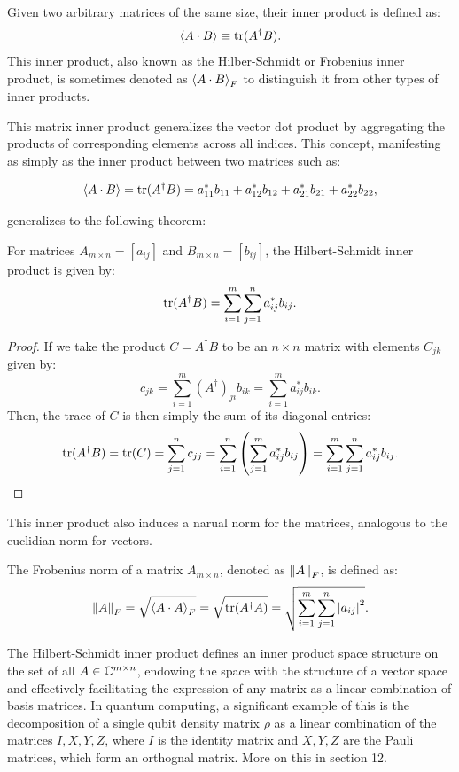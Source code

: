 \documentclass[12pt]{article}
\begin{document}
\begin{definition}
    Given two arbitrary matrices of the same size, their inner product is defined as:
    $$\left\langle A \cdot B \right\rangle \equiv \operatorname{tr}(A^\dagger B).$$
    This inner product, also known as the Hilber-Schmidt or Frobenius inner product, is sometimes denoted as $\left\langle A \cdot B \right\rangle_F$ to distinguish it from other types of inner products. 
\end{definition}

This matrix inner product generalizes the vector dot product by aggregating the products of corresponding elements across all indices. This concept, manifesting as simply as the inner product between two matrices such as:

$$\left\langle A \cdot B \right\rangle
= \operatorname{tr}(A^{\dagger} B)
= a_{11}^{*} b_{11} + a_{12}^{*} b_{12} + a_{21}^{*} b_{21} + a_{22}^{*} b_{22}, $$

generalizes to the following theorem:

\begin{theorem}
    For matrices $A_{m \times n} = [a_{ij}]$ and $B_{m \times n} = [b_{ij}]$, the Hilbert-Schmidt inner product is given by:
    $$\operatorname{tr}(A^\dagger B) = \sum_{i=1}^{m} \sum_{j=1}^{n} a^*_{ij} b_{ij}.$$
\end{theorem}

\begin{proof}
    If we take the product $C = A^\dagger B$ to be an $n \times n$ matrix with elements $C_{jk}$ given by:
    $$c_{jk} = \sum_{i=1}^{m} (A^\dagger)_{ji} b_{ik} = \sum_{i=1}^{m} a^*_{ij} b_{ik}.$$
    Then, the trace of $C$ is then simply the sum of its diagonal entries:
    $$\operatorname{tr}(A^\dagger B) = \operatorname{tr}(C) = \sum_{j=1}^{n} c_{jj} = \sum_{i=1}^{n}\left( \sum_{j=1}^{m} a^*_{ij} b_{ij}\right)  = \sum_{i=1}^{m} \sum_{j=1}^{n} a^*_{ij} b_{ij}.$$
\end{proof}

This inner product also induces a narual norm for the matrices, analogous to the euclidian norm for vectors.

\begin{definition}
    The Frobenius norm of a matrix $A_{m \times n}$, denoted as $\norm{A}_F$, is defined as:
    $$\norm{A}_F = \sqrt{\left\langle A \cdot A \right\rangle_F} = \sqrt{\operatorname{tr}(A^\dagger A)} = \sqrt{\sum_{i=1}^{m} \sum_{j=1}^{n} \abs{a_{ij}}^2}.$$
\end{definition}

The Hilbert-Schmidt inner product defines an inner product space structure on the set of all $A \in \mathbb{C}^{m \times n}$, endowing the space with the structure of a vector space and effectively facilitating the expression of any matrix as a linear combination of basis matrices. In quantum computing, a significant example of this is the decomposition of a single qubit density matrix $\rho$ as a linear combination of the matrices ${I, X, Y, Z}$, where $I$ is the identity matrix and $X, Y, Z$ are the Pauli matrices, which form an orthognal matrix. More on this in section 12. 
\end{document}
